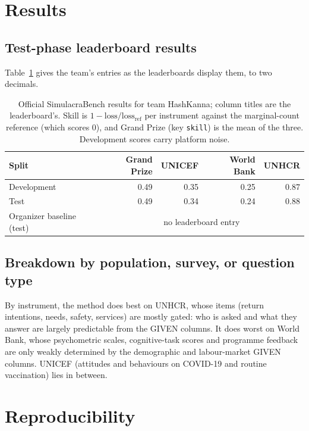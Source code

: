 \documentclass{article}
\newcommand{\teamid}{HashKanna}
\newcommand{\TestSkill}{0.49}
\newcommand{\TestUNICEF}{0.34}
\newcommand{\TestWB}{0.24}
\newcommand{\TestUNHCR}{0.88}
\begin{document}
\section{Results}
\label{sec:results}

\subsection{Test-phase leaderboard results}
Table~\ref{tab:results} gives the team's entries as the leaderboards display them, to two decimals.

\begin{table}[h]
  \centering
  \caption{Official SimulacraBench results for team \teamid; column titles are the leaderboard's.
  Skill is $1 - \text{loss}/\text{loss}_{\text{ref}}$ per instrument against the marginal-count
  reference (which scores 0), and Grand Prize (key \texttt{skill}) is the mean of the three.
  Development scores carry platform noise.}
  \label{tab:results}
  \begin{tabular}{@{}lrrrr@{}}
    \toprule
    Split & Grand Prize & UNICEF & World Bank & UNHCR \\
    \midrule
    Development & 0.49 & 0.35 & 0.25 & 0.87 \\
    Test        & \TestSkill & \TestUNICEF & \TestWB & \TestUNHCR \\
    Organizer baseline (test) & \multicolumn{4}{c}{no leaderboard entry} \\
    \bottomrule
  \end{tabular}
\end{table}

\subsection{Breakdown by population, survey, or question type}
By instrument, the method does best on UNHCR, whose items (return intentions, needs, safety,
services) are mostly gated: who is asked and what they answer are largely predictable from the
GIVEN columns. It does worst on World Bank, whose psychometric
scales, cognitive-task scores and programme feedback are only weakly determined by the
demographic and labour-market GIVEN columns. UNICEF (attitudes and behaviours on COVID-19 and
routine vaccination) lies in between.

\section{Reproducibility}
\label{sec:repro}
\end{document}

